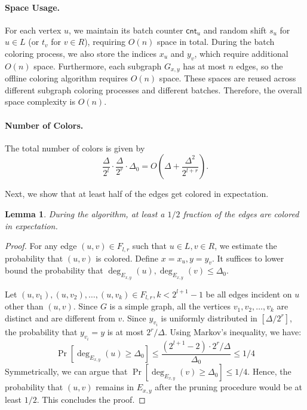 \documentclass[11pt,a4paper]{article}
\newtheorem{lemma}{Lemma}[section]
\newcommand{\cnt}{\mathsf{cnt}}
\begin{document}
\paragraph*{Space Usage.}  
For each vertex $u$, we maintain its batch counter $\cnt_u$ and random shift $s_u$ for $u \in L$ (or $t_v$ for $v \in R$), requiring $O(n)$ space in total. During the batch coloring process, we also store the indices $x_u$ and $y_v$, which require additional $O(n)$ space. Furthermore, each subgraph $G_{x, y}$ has at most $n$ edges, so the offline coloring algorithm requires $O(n)$ space. These spaces are reused across different subgraph coloring processes and different batches. Therefore, the overall space complexity is $O(n)$.

\paragraph*{Number of Colors.}  
The total number of colors is given by
$$
\frac{\Delta}{2^l} \cdot \frac{\Delta}{2^r} \cdot \Delta_0 = O \left( \Delta + \frac{\Delta^2}{2^{l+r}} \right).
$$

Next, we show that at least half of the edges get colored in expectation.

\begin{lemma}\label{lemma:high-deg-uncolored}
	During the algorithm, at least a $1/2$ fraction of the edges are colored in expectation.
\end{lemma}
\begin{proof}
    For any edge $(u, v)\in F_{l, r}$ such that $u\in L, v\in R$, we estimate the probability that $(u, v)$ is colored. 
    Define $x = x_u, y = y_v$. It suffices to lower bound the probability that $\deg_{E_{x, y}}(u), \deg_{E_{x, y}}(v) \leq \Delta_0$.

    Let $(u, v_1), (u, v_2), \ldots, (u, v_k)\in F_{l, r}, k<2^{l+1}-1$ be all edges incident on $u$ other than $(u, v)$. Since $G$ is a simple graph, all the vertices $v_1, v_2, \ldots, v_k$ are distinct and are different from $v$. Since $y_{v_i}$ is uniformly distributed in $[\Delta / 2^r]$, the probability that $y_{v_i} = y$ is at most $2^r / \Delta$. Using Markov's inequality, we have:
    $$\Pr[\deg_{E_{x, y}}(u)\geq \Delta_0]\leq \frac{(2^{l+1}-2)\cdot 2^r / \Delta}{\Delta_0} \leq 1/4$$
    Symmetrically, we can argue that $\Pr[\deg_{E_{x, y}}(v)\geq \Delta_0] \leq 1/4$. Hence, the probability that $(u, v)$ remains in $E_{x, y}$ after the pruning procedure would be at least $1/2$. This concludes the proof.
\end{proof}
\end{document}
